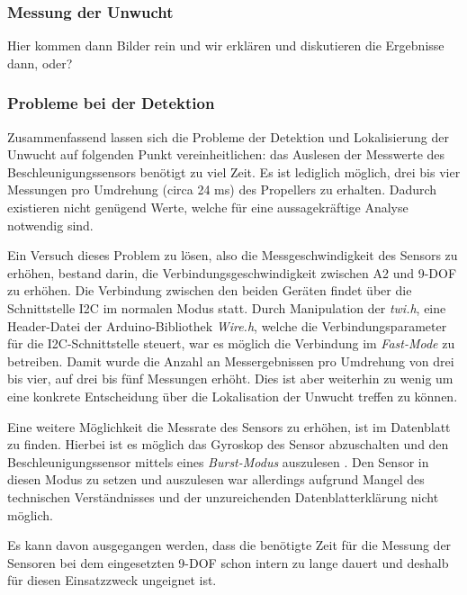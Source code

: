 \subsubsection*{Messung der Unwucht}
Hier kommen dann Bilder rein und wir erklären und diskutieren die Ergebnisse dann, oder?

\subsubsection*{Probleme bei der Detektion}
Zusammenfassend lassen sich die Probleme der Detektion und Lokalisierung der Unwucht auf folgenden Punkt vereinheitlichen: das Auslesen der Messwerte des Beschleunigungssensors benötigt zu viel Zeit.
Es ist lediglich möglich, drei bis vier Messungen pro Umdrehung (circa 24 \ac{ms}) des Propellers zu erhalten.
Dadurch existieren nicht genügend Werte, welche für eine aussagekräftige Analyse notwendig sind.

Ein Versuch dieses Problem zu lösen, also die Messgeschwindigkeit des Sensors zu erhöhen, bestand darin, die Verbindungsgeschwindigkeit zwischen \ac{A2} und \ac{9-DOF} zu erhöhen.
Die Verbindung zwischen den beiden Geräten findet über die Schnittstelle \ac{I2C} im normalen Modus statt.
Durch Manipulation der \emph{twi.h}, eine Header-Datei der Arduino-Bibliothek \emph{Wire.h}, welche die Verbindungsparameter für die \ac{I2C}-Schnittstelle steuert, war es möglich die Verbindung im \emph{Fast-Mode} zu betreiben.
Damit wurde die Anzahl an Messergebnissen pro Umdrehung von drei bis vier, auf drei bis fünf Messungen erhöht.
Dies ist aber weiterhin zu wenig um eine konkrete Entscheidung über die Lokalisation der Unwucht treffen zu können.

Eine weitere Möglichkeit die Messrate des Sensors zu erhöhen, ist im Datenblatt zu finden.
Hierbei ist es möglich das Gyroskop des Sensor abzuschalten und den Beschleunigungssensor mittels eines \emph{Burst-Modus} auszulesen \cite{lsm9ds1_manual}.
Den Sensor in diesen Modus zu setzen und auszulesen war allerdings aufgrund Mangel des technischen Verständnisses und der unzureichenden Datenblatterklärung nicht möglich.

Es kann davon ausgegangen werden, dass die benötigte Zeit für die Messung der Sensoren bei dem eingesetzten \ac{9-DOF} schon intern zu lange dauert und deshalb für diesen Einsatzzweck ungeignet ist.
